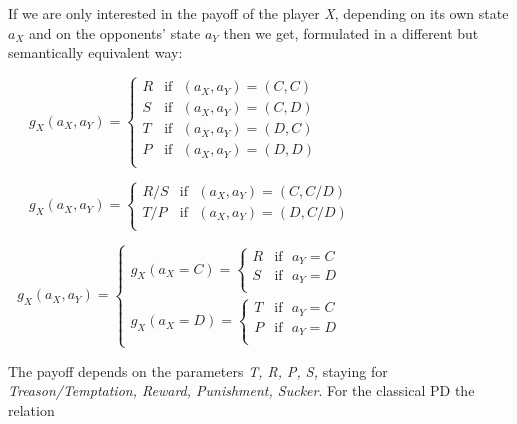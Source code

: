 \documentclass[10pt,a4paper]{article}  %
\begin{document}
If we are only interested in the payoff of the player \textit{X},
depending on its own state $a_{X}$ and on the opponents' state $a_{Y}$
then we get, formulated in a different but semantically equivalent way:

~~~$g_{X}(a_{X}, a_{Y})  =
\begin{cases}
  R & \text{if~ } (a_{X}, a_{Y}) = (C,C) \\                      
  S & \text{if~ } (a_{X}, a_{Y}) = (C,D) \\                      
  T & \text{if~ } (a_{X}, a_{Y}) = (D,C) \\                      
  P & \text{if~ } (a_{X}, a_{Y}) = (D,D) \\
\end{cases}$

~~~$g_{X}(a_{X}, a_{Y})  =
\begin{cases}
  R/S & \text{if~ } (a_{X}, a_{Y}) = (C,C/D) \\                                          
  T/P & \text{if~ } (a_{X}, a_{Y}) = (D,C/D) \\                      
\end{cases}$

$
~~~g_{X}(a_{X}, a_{Y})  =
\begin{cases}
  g_{X}(a_{X}=C) = \begin{cases}
                            R & \text{if~ } a_{Y}=C\\
                            S & \text{if~ } a_{Y}=D\\
                           \end{cases}\\
                              
  g_{X}(a_{X}=D) = \begin{cases}
                            T & \text{if~ } a_{Y}=C\\
                            P & \text{if~ } a_{Y}=D\\
                           \end{cases}                      
\end{cases}
$

The payoff  depends on the parameters 
\textit{T, R, P, S,}
staying for \textit{Treason/Temptation, Reward, Punishment, Sucker}.
For the classical PD the relation
\end{document}
